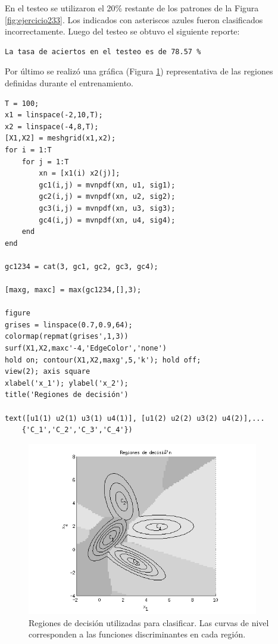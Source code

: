 \documentclass[11pt,a4paper,final]{article}
\begin{document}
En el testeo se utilizaron el 20\% restante de los patrones de la Figura \ref{fig:ejercicio233}. Los indicados con asteriscos azules fueron clasificados incorrectamente. Luego del testeo se obtuvo el siguiente reporte:

\begin{verbatim}La tasa de aciertos en el testeo es de 78.57 %
\end{verbatim}
    
Por último se realizó una gráfica (Figura \ref{fig:ejercicio234}) representativa de las regiones definidas durante el entrenamiento.

\begin{verbatim}
T = 100;
x1 = linspace(-2,10,T);
x2 = linspace(-4,8,T);
[X1,X2] = meshgrid(x1,x2);
for i = 1:T
    for j = 1:T
        xn = [x1(i) x2(j)];
        gc1(i,j) = mvnpdf(xn, u1, sig1);
        gc2(i,j) = mvnpdf(xn, u2, sig2);
        gc3(i,j) = mvnpdf(xn, u3, sig3);
        gc4(i,j) = mvnpdf(xn, u4, sig4);
    end
end

gc1234 = cat(3, gc1, gc2, gc3, gc4);

[maxg, maxc] = max(gc1234,[],3);

figure
grises = linspace(0.7,0.9,64);
colormap(repmat(grises',1,3))
surf(X1,X2,maxc'-4,'EdgeColor','none')
hold on; contour(X1,X2,maxg',5,'k'); hold off;
view(2); axis square
xlabel('x_1'); ylabel('x_2');
title('Regiones de decisión')

text([u1(1) u2(1) u3(1) u4(1)], [u1(2) u2(2) u3(2) u4(2)],...
    {'C_1','C_2','C_3','C_4'})
\end{verbatim}

\begin{figure}[h]
\includegraphics [width=0.9\textwidth]{Ejercicio2_04.png}
\caption{Regiones de decisión utilizadas para clasificar. Las curvas de nivel corresponden a las funciones discriminantes en cada región.}
\label{fig:ejercicio234}
\end{figure}
\end{document}
